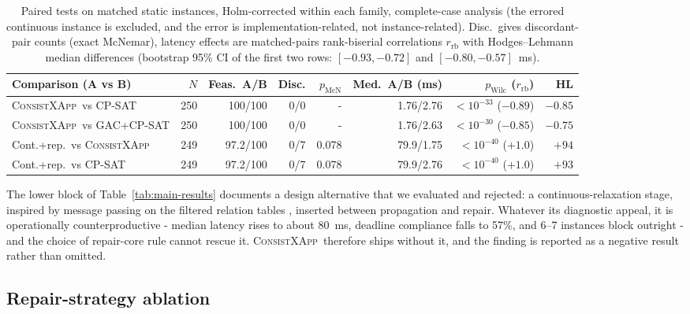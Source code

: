 \documentclass[pdflatex,sn-mathphys-num,iicol,oneside]{sn-jnl}
\newcommand{\method}{\textsc{ConsistXApp}}
\newcommand{\gac}{\textsc{GAC}}
\newcommand{\cpsat}{\textsc{CP-SAT}}
\begin{document}
\begin{table}[t]
\centering
\caption{Paired tests on matched static instances, Holm-corrected
within each family, complete-case analysis (the errored continuous
instance is excluded, and the error is implementation-related, not
instance-related). Disc.\ gives discordant-pair counts (exact
McNemar), latency effects are matched-pairs rank-biserial correlations
$r_{\mathrm{rb}}$ with Hodges--Lehmann median differences (bootstrap
95\% CI of the first two rows: $[-0.93,-0.72]$ and
$[-0.80,-0.57]$~ms).}
\label{tab:stats-paired}
\setlength{\tabcolsep}{4pt}\small
\begin{tabular}{lrrrrrrr}
\toprule
Comparison (A vs B) & $N$ & Feas.\ A/B & Disc. &
$p_{\mathrm{McN}}$ & Med.\ A/B (ms) & $p_{\mathrm{Wilc}}$
($r_{\mathrm{rb}}$) & HL\\
\midrule
\method\ vs \cpsat & 250 & 100/100 & 0/0 &  -  & 1.76/2.76 &
$<10^{-33}$ ($-0.89$) & $-0.85$\\
\method\ vs \gac+\cpsat & 250 & 100/100 & 0/0 &  -  & 1.76/2.63 &
$<10^{-30}$ ($-0.85$) & $-0.75$\\
Cont.+rep.\ vs \method & 249 & 97.2/100 & 0/7 & 0.078 & 79.9/1.75 &
$<10^{-40}$ ($+1.0$) & $+94$\\
Cont.+rep.\ vs \cpsat & 249 & 97.2/100 & 0/7 & 0.078 & 79.9/2.76 &
$<10^{-40}$ ($+1.0$) & $+93$\\
\bottomrule
\end{tabular}
\normalsize
\end{table}

The lower block of Table~\ref{tab:main-results} documents a design
alternative that we evaluated and rejected: a continuous-relaxation
stage, inspired by message passing on the filtered relation tables
\cite{yedidia2003understanding}, inserted between propagation and
repair. Whatever its diagnostic appeal, it is operationally
counterproductive - median latency rises to about 80~ms, deadline
compliance falls to 57\%, and 6--7 instances block outright - and the
choice of repair-core rule cannot rescue it. \method\ therefore ships
without it, and the finding is reported as a negative result rather
than omitted.

\subsection{Repair-strategy ablation}
\end{document}
